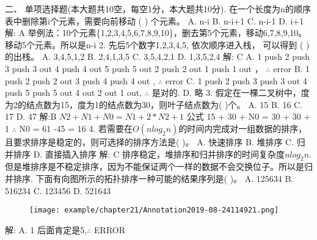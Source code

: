 二、 单项选择题(本大题共10空，每空1分，本大题共10分). 在一个长度为n的顺序表中删除第i个元素，需要向前移动 (  ) 个元素。\newline
A. n-i       B. n-i+1    C. n-i-1   D. i+1\newline
解: A \newline
举例法：10个元素\{1,2,3,4,5,6,7,8,9,10\}，删去第5个元素，移动6,7,8,9,10。移动5个元素。所以是n-i
2. 先后5个数字1,2,3,4,5, 依次顺序进入栈， 可以得到 (  ) 的出栈。\newline
A. 3,4,5,1,2           B. 2,4,1,3,5\newline
C. 3,5,4,2,1           D. 1,3,5,2,4\newline
解: C\newline
A. 1 push 2 push 3 push 3 out 4 push 4 out 5 push 5 out 2 push 2 out 1 push 1 out ， $\therefore$ error\newline 
B. 1 push 2 push 2 out 3 push 4 push 4 out , $\therefore$ error\newline
C. 1 push 2 push 3 push 3 out 4 push 5 push 5 out 4 out 2 out 1 out, $\therefore$ 是对的.\newline
D. 略
3. 假定在一棵二叉树中，度为2的结点数为15，度为1的结点数为30，则叶子结点数为(  )个。\newline
A. 15   B. 16    C. 17  D. 47 \newline
解:B \newline
$N2 + N1 + N0 = N1 + 2*N2 + 1$ 公式 15 + 30 + N0 = 30 + 30 + 1 $\therefore$ N0 = 61 -45 = 16
4. 若需要在$O(nlog_2n)$的时间内完成对一组数据的排序，且要求排序是稳定的，则可选择的排序方法是(  )。\newline
A. 快速排序    B. 堆排序  C. 归并排序  D. 直接插入排序 \newline
解: C \newline
排序稳定，堆排序和归并排序的时间复杂度$nlog_2n$.但是堆排序是不稳定排序，因为不能保证两个一样的数据不会交换位子。所以是归并排序. 下面有向图所示的拓扑排序一种可能的结果序列是(  )。\newline
A. 125634     B.  516234    C.  123456    D. 521643\newline
\begin{figure}[H]
	\centering  %
	\texttt{[image: example/chapter21/Annotation2019-08-24114921.png]}
\end{figure}
解: \newline
A. 1 后面肯定是5,$\therefore$ ERROR \newline
